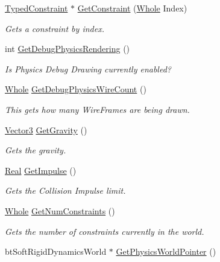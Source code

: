 \begin{DoxyCompactItemize}
\hyperlink{classphys_1_1TypedConstraint}{TypedConstraint} $\ast$ \hyperlink{classphys_1_1PhysicsManager_af3a7b3a98c885785875375cae608b4d5}{GetConstraint} (\hyperlink{namespacephys_a460f6bc24c8dd347b05e0366ae34f34a}{Whole} Index)
\begin{DoxyCompactList}\small\item\em Gets a constraint by index. \item\end{DoxyCompactList}\item 
int \hyperlink{classphys_1_1PhysicsManager_a64f96d2e4b25c2b9a66042998bf334ff}{GetDebugPhysicsRendering} ()
\begin{DoxyCompactList}\small\item\em Is Physics Debug Drawing currently enabled? \item\end{DoxyCompactList}\item 
\hyperlink{namespacephys_a460f6bc24c8dd347b05e0366ae34f34a}{Whole} \hyperlink{classphys_1_1PhysicsManager_a8f46e55e4cadfcd1c2c03bcdbfe6c06f}{GetDebugPhysicsWireCount} ()
\begin{DoxyCompactList}\small\item\em This gets how many WireFrames are being drawn. \item\end{DoxyCompactList}\item 
\hyperlink{classphys_1_1Vector3}{Vector3} \hyperlink{classphys_1_1PhysicsManager_a880950ca6093afd3267dcadf30934574}{GetGravity} ()
\begin{DoxyCompactList}\small\item\em Gets the gravity. \item\end{DoxyCompactList}\item 
\hyperlink{namespacephys_af7eb897198d265b8e868f45240230d5f}{Real} \hyperlink{classphys_1_1PhysicsManager_ad11ee3904e1725f95ce9bd58f4ee3925}{GetImpulse} ()
\begin{DoxyCompactList}\small\item\em Gets the Collision Impulse limit. \item\end{DoxyCompactList}\item 
\hyperlink{namespacephys_a460f6bc24c8dd347b05e0366ae34f34a}{Whole} \hyperlink{classphys_1_1PhysicsManager_aa21fe7e9349d638020627c58b90faa38}{GetNumConstraints} ()
\begin{DoxyCompactList}\small\item\em Gets the number of constraints currently in the world. \item\end{DoxyCompactList}\item 
\hypertarget{classphys_1_1PhysicsManager_a4b4f8a23259a94a50c81649f39256d7f}{
btSoftRigidDynamicsWorld $\ast$ \hyperlink{classphys_1_1PhysicsManager_a4b4f8a23259a94a50c81649f39256d7f}{GetPhysicsWorldPointer} ()}
\label{classphys_1_1PhysicsManager_a4b4f8a23259a94a50c81649f39256d7f}


\end{DoxyCompactItemize}

